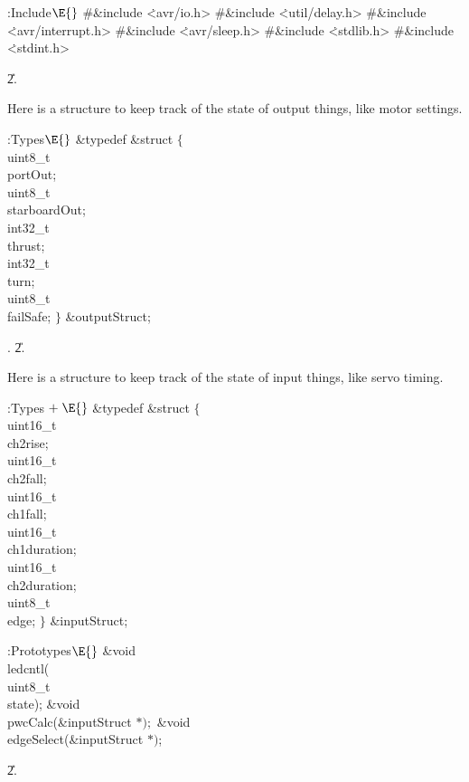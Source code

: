 \B{}:Include\X${}\E{}$\6
\8\#\&{include} \.{<avr/io.h>}\6
\8\#\&{include} \.{<util/delay.h>}\6
\8\#\&{include} \.{<avr/interrupt.h>}\6
\8\#\&{include} \.{<avr/sleep.h>}\6
\8\#\&{include} \.{<stdlib.h>}\6
\8\#\&{include} \.{<stdint.h>}\par
\U2.\fi

Here is a structure to keep track of the state of output things,
like motor settings.

\Y\B\4:Types\X${}\E{}$\6
\&{typedef} \&{struct} ${}\{{}$\1\6
\\{uint8\_t}\\{portOut};\6
\\{uint8\_t}\\{starboardOut};\6
\\{int32\_t}\\{thrust};\6
\\{int32\_t}\\{turn};\6
\\{uint8\_t}\\{failSafe};\2\6
${}\}{}$ \&{outputStruct};\par
{}.
\U2.\fi

Here is a structure to keep track of the state of input things,
like servo timing.

\Y\B\4:Types\X${}\mathrel+\E{}$\6
\&{typedef} \&{struct} ${}\{{}$\1\6
\\{uint16\_t}\\{ch2rise};\6
\\{uint16\_t}\\{ch2fall};\6
\\{uint16\_t}\\{ch1fall};\6
\\{uint16\_t}\\{ch1duration};\6
\\{uint16\_t}\\{ch2duration};\6
\\{uint8\_t}\\{edge};\2\6
${}\}{}$ \&{inputStruct};\par
\fi

\B{}:Prototypes\X${}\E{}$\6
\&{void} \\{ledcntl}(\\{uint8\_t}\\{state});\6
\&{void} \\{pwcCalc}(\&{inputStruct} ${}{*});{}$\6
\&{void} \\{edgeSelect}(\&{inputStruct} ${}{*}){}$;\par
\U2.\fi

